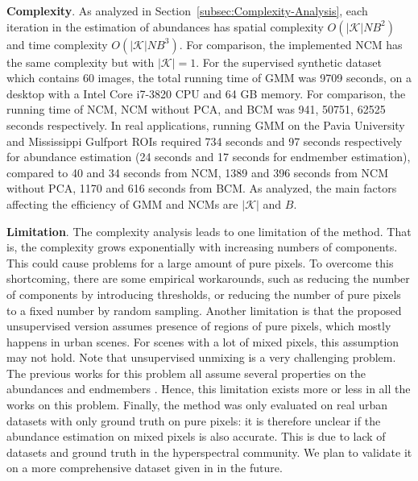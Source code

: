 \documentclass[twocolumn,english]{IEEEtran}
\theoremstyle{plain}
\begin{document}
\textbf{Complexity}. As analyzed in Section~\ref{subsec:Complexity-Analysis},
each iteration in the estimation of abundances has spatial complexity
$O\left(\left|\mathcal{K}\right|NB^{2}\right)$ and time complexity
$O\left(\left|\mathcal{K}\right|NB^{3}\right)$. For comparison, the
implemented NCM has the same complexity but with $\left|\mathcal{K}\right|=1$.
For the supervised synthetic dataset which contains 60 images, the
total running time of GMM was 9709 seconds, on a desktop with a Intel
Core i7-3820 CPU and 64 GB memory. For comparison, the running time
of NCM, NCM without PCA, and BCM was 941, 50751, 62525 seconds respectively.
In real applications, running GMM on the Pavia University and Mississippi
Gulfport ROIs required 734 seconds and 97 seconds respectively for
abundance estimation (24 seconds and 17 seconds for endmember estimation),
compared to 40 and 34 seconds from NCM, 1389 and 396 seconds from
NCM without PCA, 1170 and 616 seconds from BCM. As analyzed, the main
factors affecting the efficiency of GMM and NCMs are $\left|\mathcal{K}\right|$
and $B$.

\textbf{Limitation}. The complexity analysis leads to one limitation
of the method. That is, the complexity grows exponentially with increasing
numbers of components. This could cause problems for a large amount
of pure pixels. To overcome this shortcoming, there are some empirical
workarounds, such as reducing the number of components by introducing
thresholds, or reducing the number of pure pixels to a fixed number
by random sampling. Another limitation is that the proposed unsupervised
version assumes presence of regions of pure pixels, which mostly happens
in urban scenes. For scenes with a lot of mixed pixels, this assumption
may not hold. Note that unsupervised unmixing is a very challenging
problem. The previous works for this problem all assume several properties
on the abundances and endmembers \cite{drumetz2016blind,thouvenin2016hyperspectral,halimi2016hyperspectral}.
Hence, this limitation exists more or less in all the works on this
problem. Finally, the method was only evaluated on real urban datasets
with only ground truth on pure pixels: it is therefore unclear if
the abundance estimation on mixed pixels is also accurate. This is
due to lack of datasets and ground truth in the hyperspectral community.
We plan to validate it on a more comprehensive dataset given in \cite{wetherley2017mapping}
in the future.
\end{document}
